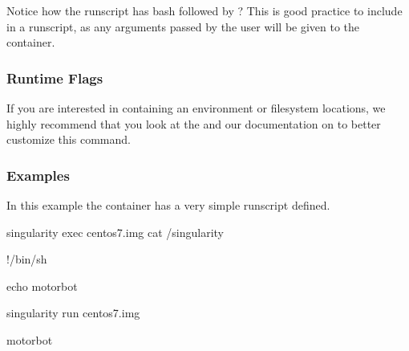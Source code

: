 \documentclass[letterpaper,10pt,english]{sphinxmanual}
\begin{document}
Notice how the runscript has bash followed by  ? This is good practice
to include in a runscript, as any arguments passed by the user will be
given to the container.


\subsubsection{Runtime Flags}
\label{\detokenize{appendix:id36}}
If you are interested in containing an environment or filesystem
locations, we highly recommend that you look at the  and our
documentation on {\hyperref[\detokenize{appendix:singularity-action-flags}]{}}
to better customize this command.


\subsubsection{Examples}
\label{\detokenize{appendix:id37}}
In this example the container has a very simple runscript defined.

%
\begin{sphinxVerbatim}[commandchars=\\\{\}]
\PYGZdl{} singularity exec centos7.img cat /singularity

\PYGZsh{}!/bin/sh


echo motorbot


\PYGZdl{} singularity run centos7.img

motorbot
\end{sphinxVerbatim}
\end{document}
